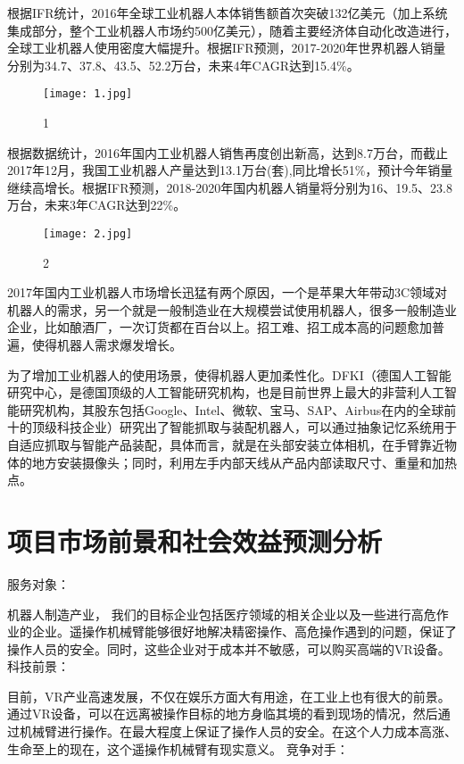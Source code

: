 根据IFR统计，2016年全球工业机器人本体销售额首次突破132亿美元（加上系统
集成部分，整个工业机器人市场约500亿美元），随着主要经济体自动化改造进行，全球工业机器人使用密度大幅提升。根据IFR预测，2017-2020年世界机器人销量分别为34.7、37.8、43.5、52.2万台，未来4年CAGR达到15.4\%。


\begin{figure}[htbp]
\small
\centering
\texttt{[image: 1.jpg]}
\caption{1} 
\label{1}
\end{figure}

根据数据统计，2016年国内工业机器人销售再度创出新高，达到8.7万台，而截止
2017年12月，我国工业机器人产量达到13.1万台(套),同比增长51\%，预计今年销量继续高增长。根据IFR预测，2018-2020年国内机器人销量将分别为16、19.5、23.8万台，未来3年CAGR达到22\%。


\begin{figure}[htbp]
\small
\centering
\texttt{[image: 2.jpg]}
\caption{2} 
\label{2}
\end{figure}

2017年国内工业机器人市场增长迅猛有两个原因，一个是苹果大年带动3C领域对机器人的需求，另一个就是一般制造业在大规模尝试使用机器人，很多一般制造业企业，比如酿酒厂，一次订货都在百台以上。招工难、招工成本高的问题愈加普遍，使得机器人需求爆发增长。

为了增加工业机器人的使用场景，使得机器人更加柔性化。DFKI（德国人工智能
研究中心，是德国顶级的人工智能研究机构，也是目前世界上最大的非营利人工智能研究机构，其股东包括Google、Intel、微软、宝马、SAP、Airbus在内的全球前十的顶级科技企业）研究出了智能抓取与装配机器人，可以通过抽象记忆系统用于自适应抓取与智能产品装配，具体而言，就是在头部安装立体相机，在手臂靠近物体的地方安装摄像头；同时，利用左手内部天线从产品内部读取尺寸、重量和加热点。


\chapter{项目市场前景和社会效益预测分析}


服务对象：


机器人制造产业，
我们的目标企业包括医疗领域的相关企业以及一些进行高危作业的企业。遥操作机械臂能够很好地解决精密操作、高危操作遇到的问题，保证了操作人员的安全。同时，这些企业对于成本并不敏感，可以购买高端的VR设备。
\newline
科技前景：

目前，VR产业高速发展，不仅在娱乐方面大有用途，在工业上也有很大的前景。通过VR设备，可以在远离被操作目标的地方身临其境的看到现场的情况，然后通过机械臂进行操作。在最大程度上保证了操作人员的安全。在这个人力成本高涨、生命至上的现在，这个遥操作机械臂有现实意义。
\newline
竞争对手：

